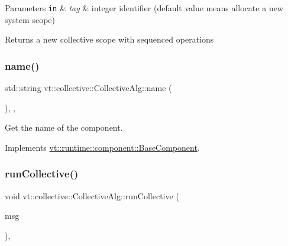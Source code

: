 \begin{DoxyParams}[1]{Parameters}
\mbox{\tt in}  & {\em tag} & integer identifier (default value means allocate a new system scope)\\
\hline
\end{DoxyParams}
\begin{DoxyReturn}{Returns}
a new collective scope with sequenced operations 
\end{DoxyReturn}
\mbox{\label{structvt_1_1collective_1_1_collective_alg_a81788afa34bc094c9f71fef8681aefb3}} 
\subsubsection{\texorpdfstring{name()}{name()}}
{\footnotesize\ttfamily std\+::string vt\+::collective\+::\+Collective\+Alg\+::name (\begin{DoxyParamCaption}{ }\end{DoxyParamCaption})\hspace{0.3cm}{\ttfamily [inline]}, {\ttfamily [override]}, {\ttfamily [virtual]}}



Get the name of the component. 



Implements \hyperlink{structvt_1_1runtime_1_1component_1_1_base_component_a7701485f3539f78d42e6bad47fc7eb78}{vt\+::runtime\+::component\+::\+Base\+Component}.

\mbox{\label{structvt_1_1collective_1_1_collective_alg_a9ed7397e91a18458c3a578be3605baa9}} 
\subsubsection{\texorpdfstring{run\+Collective()}{runCollective()}}
{\footnotesize\ttfamily void vt\+::collective\+::\+Collective\+Alg\+::run\+Collective (\begin{DoxyParamCaption}\item[{\hyperlink{structvt_1_1collective_1_1_collective_alg_1_1_collective_msg}{Collective\+Msg} $\ast$}]{msg }\end{DoxyParamCaption})\hspace{0.3cm}{\ttfamily [static]}, {\ttfamily [private]}}



